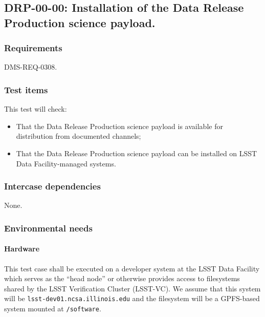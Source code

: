 \subsection{DRP-00-00: Installation of the Data Release Production science payload.}
\label{drp-00-00}

\subsubsection{Requirements}

DMS-REQ-0308.

\subsubsection{Test items}

This test will check:

\begin{itemize}

  \item{That the Data Release Production science payload is available for
  distribution from documented channels;}

  \item{That the Data Release Production science payload can be installed on
  LSST Data Facility-managed systems.}

\end{itemize}

\subsubsection{Intercase dependencies}

None.

\subsubsection{Environmental needs}

\paragraph{Hardware}

This test case shall be executed on a developer system at the LSST Data
Facility which serves as the ``head node'' or otherwise provides access to
filesystems shared by the LSST Verification Cluster (LSST-VC). We assume that
this system will be \texttt{lsst-dev01.ncsa.illinois.edu} and the filesystem
will be a GPFS-based system mounted at \texttt{/software}.

